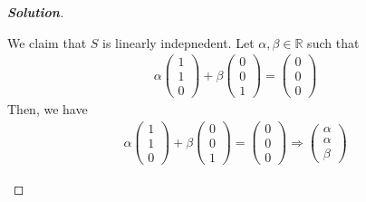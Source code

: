 \documentclass[10pt]{scrartcl}
\theoremstyle{definition}
\newenvironment{solution} {\begin{proof}[\normalfont \textbf{Solution}]} {\end{proof}}
\newcommand{\rn}{\mathbb{R}}
\begin{document}
\begin{solution}
\begin{enumerate}[label={(\roman*)}]
            We claim that $S$ is linearly indepnedent. Let $\alpha, \beta \in \rn$ such that 
            \begin{gather*}
                \alpha
                \begin{pmatrix}
                    1 \\ 
                    1 \\ 
                    0 
                \end{pmatrix}
                +
                \beta
                \begin{pmatrix}
                    0 \\ 
                    0 \\ 
                    1 
                \end{pmatrix}
                =
                \begin{pmatrix}
                    0 \\ 
                    0 \\ 
                    0
                \end{pmatrix}
            \end{gather*}
            Then, we have 
            \begin{gather*}
                \alpha
                \begin{pmatrix}
                    1 \\ 
                    1 \\ 
                    0 
                \end{pmatrix}
                +
                \beta
                \begin{pmatrix}
                    0 \\ 
                    0 \\ 
                    1 
                \end{pmatrix}
                =
                \begin{pmatrix}
                    0 \\ 
                    0 \\ 
                    0
                \end{pmatrix}
                \Rightarrow
                \begin{pmatrix}
                    \alpha \\ 
                    \alpha \\ 
                    \beta 
                \end{pmatrix}

\end{gather*}
\end{enumerate}
\end{solution}
\end{document}
